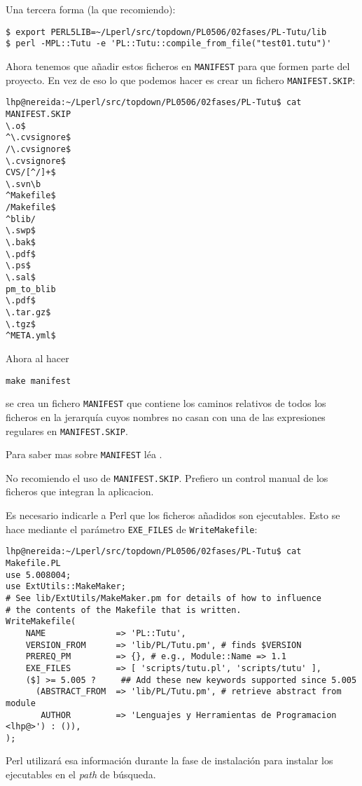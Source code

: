 Una tercera forma (la que recomiendo):
\begin{verbatim}
$ export PERL5LIB=~/Lperl/src/topdown/PL0506/02fases/PL-Tutu/lib
$ perl -MPL::Tutu -e 'PL::Tutu::compile_from_file("test01.tutu")'
\end{verbatim}


Ahora tenemos que añadir estos ficheros en \verb|MANIFEST| para que formen
parte del proyecto. En vez de eso lo que podemos hacer es crear un fichero
\verb|MANIFEST.SKIP|:
\begin{verbatim}
lhp@nereida:~/Lperl/src/topdown/PL0506/02fases/PL-Tutu$ cat MANIFEST.SKIP
\.o$
^\.cvsignore$
/\.cvsignore$
\.cvsignore$
CVS/[^/]+$
\.svn\b
^Makefile$
/Makefile$
^blib/
\.swp$
\.bak$
\.pdf$
\.ps$
\.sal$
pm_to_blib
\.pdf$
\.tar.gz$
\.tgz$
^META.yml$
\end{verbatim}
Ahora al hacer
\begin{verbatim}
make manifest
\end{verbatim}
se crea un fichero \verb|MANIFEST| que contiene los caminos 
relativos de todos los ficheros
en la jerarquía cuyos nombres no casan con una de las expresiones
regulares en \verb|MANIFEST.SKIP|.

Para saber mas sobre \verb|MANIFEST| léa 
.

No recomiendo el uso de \verb|MANIFEST.SKIP|. Prefiero un control manual de los
ficheros que integran la aplicacion.


Es necesario indicarle a Perl que los ficheros añadidos son ejecutables.
Esto se hace mediante el par\'ametro \verb|EXE_FILES| de \verb|WriteMakefile|:
\begin{verbatim}
lhp@nereida:~/Lperl/src/topdown/PL0506/02fases/PL-Tutu$ cat Makefile.PL
use 5.008004;
use ExtUtils::MakeMaker;
# See lib/ExtUtils/MakeMaker.pm for details of how to influence
# the contents of the Makefile that is written.
WriteMakefile(
    NAME              => 'PL::Tutu',
    VERSION_FROM      => 'lib/PL/Tutu.pm', # finds $VERSION
    PREREQ_PM         => {}, # e.g., Module::Name => 1.1
    EXE_FILES         => [ 'scripts/tutu.pl', 'scripts/tutu' ],
    ($] >= 5.005 ?     ## Add these new keywords supported since 5.005
      (ABSTRACT_FROM  => 'lib/PL/Tutu.pm', # retrieve abstract from module
       AUTHOR         => 'Lenguajes y Herramientas de Programacion <lhp@>') : ()),
);
\end{verbatim}
Perl utilizará esa información durante la fase de instalación
para instalar los ejecutables en el \emph{path} de búsqueda.

